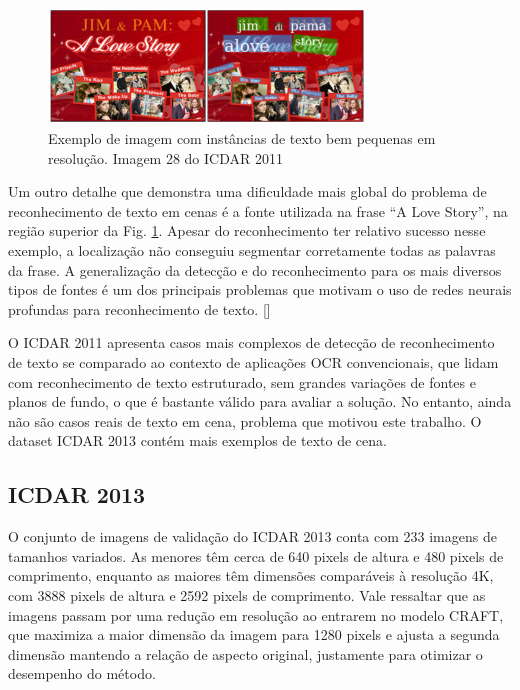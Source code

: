 \begin{figure}
    \centering
    \includegraphics[width=0.75\textwidth]{figs/resultados-icdar11-03.png}
    \caption{Exemplo de imagem com instâncias de texto bem pequenas em resolução. Imagem 28 do ICDAR 2011}
    \label{fig:results_icdar11_03}
\end{figure}

Um outro detalhe que demonstra uma dificuldade mais global do problema de reconhecimento de texto em cenas é a fonte utilizada na frase “A Love Story”, na região superior da Fig. \ref{fig:results_icdar11_03}. Apesar do reconhecimento ter relativo sucesso nesse exemplo, a localização não conseguiu segmentar corretamente todas as palavras da frase. A generalização da detecção e do reconhecimento para os mais diversos tipos de fontes é um dos principais problemas que motivam o uso de redes neurais profundas para reconhecimento de texto. []

O ICDAR 2011 apresenta casos mais complexos de detecção de reconhecimento de texto se comparado ao contexto de aplicações OCR convencionais, que lidam com reconhecimento de texto estruturado, sem grandes variações de fontes e planos de fundo, o que é bastante válido para avaliar a solução. No entanto, ainda não são casos reais de texto em cena, problema que motivou este trabalho. O dataset ICDAR 2013 contém mais exemplos de texto de cena.


\subsection{ICDAR 2013}\label{sec:results_icdar_2013}

O conjunto de imagens de validação do ICDAR 2013 conta com 233 imagens de tamanhos variados. As menores têm cerca de 640 pixels de altura e 480 pixels de comprimento, enquanto as maiores têm dimensões comparáveis à resolução 4K, com 3888 pixels de altura e 2592 pixels de comprimento. Vale ressaltar que as imagens passam por uma redução em resolução ao entrarem no modelo CRAFT, que maximiza a maior dimensão da imagem para 1280 pixels e ajusta a segunda dimensão mantendo a relação de aspecto original, justamente para otimizar o desempenho do método.

